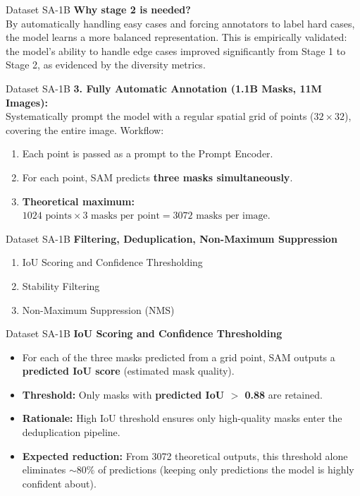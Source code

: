 \documentclass[11pt, aspectratio=169]{beamer}
\begin{document}
\begin{frame}{Dataset SA-1B}
	\textbf{Why stage 2 is needed?}\\
	By automatically handling easy cases and forcing annotators to label hard cases, the model learns a more balanced representation. This is empirically validated: the model's ability to handle edge cases improved significantly from Stage 1 to Stage 2, as evidenced by the diversity metrics.
\end{frame}

\begin{frame}{Dataset SA-1B}
	\textbf{3. Fully Automatic Annotation (1.1B Masks, 11M Images):} \\
	Systematically prompt the model with a regular spatial grid of points ($32 \times 32$), covering the entire image.
	Workflow:
	\begin{enumerate}
		\item Each point is passed as a prompt to the Prompt Encoder.
		\item For each point, SAM predicts \textbf{three masks simultaneously}.
		\item \textbf{Theoretical maximum:} $1024 \text{ points} \times 3 \text{ masks per point} = 3072 \text{ masks per image}$.
	\end{enumerate}
\end{frame}

\begin{frame}{Dataset SA-1B}
	\textbf{Filtering, Deduplication, Non-Maximum Suppression}\\
	\begin{enumerate}
		\item IoU Scoring and Confidence Thresholding
		\item Stability Filtering
		\item Non-Maximum Suppression (NMS)
	\end{enumerate}
\end{frame}

\begin{frame}{Dataset SA-1B}
	\textbf{IoU Scoring and Confidence Thresholding}\\
	\begin{itemize}
		\item For each of the three masks predicted from a grid point, SAM outputs a \textbf{predicted IoU score} (estimated mask quality).
		\item \textbf{Threshold:} Only masks with \textbf{predicted IoU $>$ 0.88} are retained.
		\item \textbf{Rationale:} High IoU threshold ensures only high-quality masks enter the deduplication pipeline.
		\item \textbf{Expected reduction:} From 3072 theoretical outputs, this threshold alone eliminates $\sim$80\% of predictions (keeping only predictions the model is highly confident about).
	\end{itemize}
\end{frame}
\end{document}
